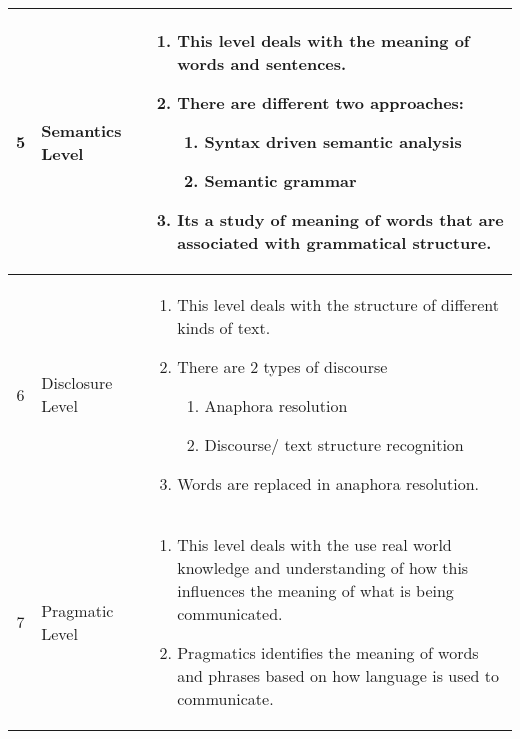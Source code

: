 \begin{customTableWrapper}{1}
\begin{longtable}{|c|m{2.7cm}|m{10cm}|}
    5 & Semantics Level & \begin{enumerate}
        \item This level deals with the meaning of words and sentences.
        \item There are different two approaches:
        \begin{enumerate}
            \item Syntax driven semantic analysis
            \item Semantic grammar
        \end{enumerate} 
        \item Its a study of meaning of words that are associated with grammatical structure.
    \end{enumerate} \\ \hline

    6 & Disclosure Level & \begin{enumerate}
        \item This level deals with the structure of different kinds of text.
        \item There are 2 types of discourse
        \begin{enumerate}
            \item Anaphora resolution
            \item Discourse/ text structure recognition
        \end{enumerate}
        \item Words are replaced in anaphora resolution.
    \end{enumerate} \\ \hline

    7 & Pragmatic Level & \begin{enumerate}
        \item This level deals with the use real world knowledge and understanding of how this influences the meaning of what is being communicated.
        \item Pragmatics identifies the meaning of words and phrases based on how language is used to communicate.
    \end{enumerate}

\end{longtable}
\end{customTableWrapper}






























